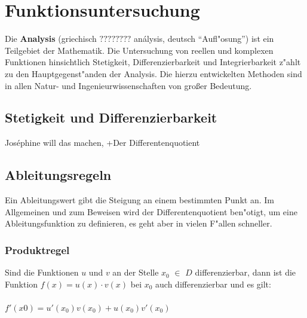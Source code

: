 \chapter{Funktionsuntersuchung}

Die \textbf{Analysis} (griechisch $????????$ análysis, deutsch "`Aufl"osung"') ist ein Teilgebiet der Mathematik.  Die Untersuchung von reellen und komplexen Funktionen hinsichtlich Stetigkeit, Differenzierbarkeit und Integrierbarkeit z"ahlt zu den Hauptgegenst"anden der Analysis. Die hierzu entwickelten Methoden sind in allen Natur- und Ingenieurwissenschaften von großer Bedeutung.\\

\section{Stetigkeit und Differenzierbarkeit}

Joséphine will das machen, +Der Differentenquotient\\

\section{Ableitungsregeln}

Ein Ableitungswert gibt die Steigung an einem bestimmten Punkt an. Im Allgemeinen und zum Beweisen wird der Differentenquotient ben"otigt, um eine Ableitungsfunktion zu definieren, es geht aber in vielen F"allen schneller.

\subsection{Produktregel}

Sind die Funktionen $u$ und $v$ an der Stelle $x_{0}$ $\in$ $D$ differenzierbar, dann ist die Funktion $f(x)=u(x)\cdot v(x)$ bei $x_{0}$ auch differenzierbar und es gilt: \\
\\
$f'(x0) = u'(x_{0})v(x_{0})+u(x_{0})v'(x_{0})$\\

